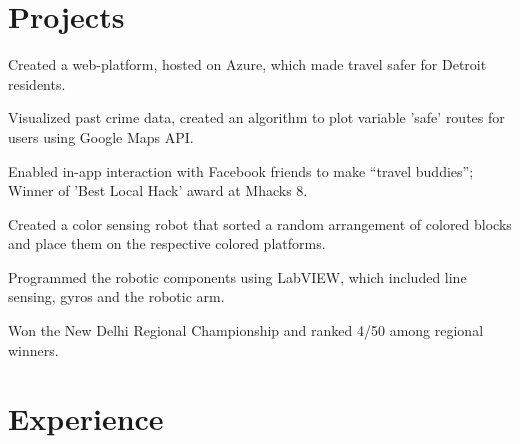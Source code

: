 \documentclass[letterpaper]{deedy-resume} %
\begin{document}
\begin{minipage}[t]{0.66\textwidth} %


\section{Projects}

\vspace{\topsep} %
\begin{tightitemize}
\item Created a web-platform, hosted on Azure, which made travel safer for Detroit residents.
\item Visualized past crime data, created an algorithm to plot variable 'safe' routes for users using Google Maps API.
\item Enabled in-app interaction with Facebook friends to make “travel buddies”; Winner of 'Best Local Hack' award at Mhacks 8.
\end{tightitemize}

\sectionspace %

\begin{tightitemize}
\item Created a color sensing robot that sorted a random arrangement of colored blocks and place them on the respective colored platforms.
\item Programmed the robotic components using LabVIEW, which included line sensing, gyros and the robotic arm.
\item Won the New Delhi Regional Championship and ranked 4/50 among regional winners.
\end{tightitemize}

\sectionspace %


\section{Experience}


\end{minipage}
\end{document}
